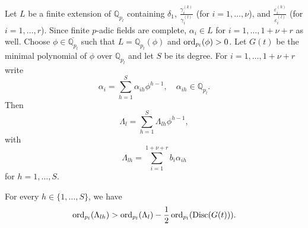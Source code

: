 Let $L$ be a finite extension of $\mathbb{Q}_{p_l}$ containing $\delta_1$, $\frac{\gamma_i^{(k)}}{\gamma_i^{(l)}}$ (for $i = 1, \dots, \nu$), and $ \frac{\varepsilon_i^{(k)}}{\varepsilon_i^{(l)}}$ (for $i = 1, \dots, r$). Since finite $p$-adic fields are complete, $\alpha_i \in L$ for $i = 1, \dots, 1+ \nu +r$ as well. Choose $\phi \in \overline{\mathbb{Q}_{p_l}}$ such that $L = \mathbb{Q}_{p_l}(\phi)$ and $\operatorname{ord}_{p_l}(\phi) > 0 $. Let $G(t)$ be the minimal polynomial of $\phi$ over $\mathbb{Q}_{p_l}$ and let $S$ be its degree. For $i = 1, \dots, 1 + \nu + r$ write
\[\alpha_i = \sum_{h = 1}^S \alpha_{ih}\phi^{h - 1}, \quad \alpha_{ih} \in \mathbb{Q}_{p_l}.\]
Then
\begin{equation} \label{Eq:lambdalh}
\Lambda_l = \sum_{h = 1}^S \Lambda_{lh}\phi^{h-1},
\end{equation}
with
\[\Lambda_{lh} = \sum_{i = 1}^{1 + \nu + r } b_i \alpha_{ih}\]
for $h = 1, \dots, S$. 

\begin{lemma}\label{Lem:discG}
For every $h \in \{1, \dots, S\}$, we have
\[\operatorname{ord}_{p_l}(\Lambda_{lh}) > \operatorname{ord}_{p_l}(\Lambda_l) - \frac{1}{2}\operatorname{ord}_{p_l}(\text{Disc}(G(t))).\]
\end{lemma}

